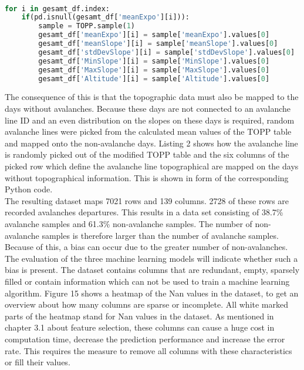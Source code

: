 \documentclass[../masterarbeit.tex]{subfiles}
\begin{document}
\\
\begin{lstlisting}[language=Python, caption=mapping random sample lines of topographical data onto the rows of non avalanche days]
for i in gesamt_df.index:
    if(pd.isnull(gesamt_df['meanExpo'][i])):
        sample = TOPP.sample(1)
        gesamt_df['meanExpo'][i] = sample['meanExpo'].values[0]
        gesamt_df['meanSlope'][i] = sample['meanSlope'].values[0]
        gesamt_df['stdDevSlope'][i] = sample['stdDevSlope'].values[0]
        gesamt_df['MinSlope'][i] = sample['MinSlope'].values[0]
        gesamt_df['MaxSlope'][i] = sample['MaxSlope'].values[0]
        gesamt_df['Altitude'][i] = sample['Altitude'].values[0]
\end{lstlisting} 
The consequence of this is that the topographic data must also be mapped to the days without avalanches. Because these days are not connected to an avalanche line ID and an even distribution on the slopes on these days is required, random avalanche lines were picked from the calculated mean values of the TOPP table and mapped onto the non-avalanche days. Listing 2 shows how the avalanche line is randomly picked out of the modified TOPP table and the six columns of the picked row which define the avalanche line topographical are mapped on the days without topographical information. This is shown in form of the corresponding Python code.\\ 
The resulting dataset maps 7021 rows and 139 columns. 2728 of these rows are recorded avalanches departures. This results in a data set consisting of 38.7\% avalanche samples and 61.3\% non-avalanche samples. The number of non-avalanche samples is therefore larger than the number of avalanche samples. Because of this, a bias can occur due to the greater number of non-avalanches. The evaluation of the three machine learning models will indicate whether such a bias is present. The dataset contains columns that are redundant, empty, sparsely filled or contain information which can not be used to train a machine learning algorithm. Figure 15 shows a heatmap of the Nan values in the dataset, to get an overview about how many columns are sparse or incomplete. All white marked parts of the heatmap stand for Nan values in the dataset.  As mentioned in chapter 3.1 about feature selection, these columns can cause a huge cost in computation time, decrease the prediction performance and increase the error rate. This requires the measure to remove all columns with these characteristics or fill their values.
\\
\end{document}
